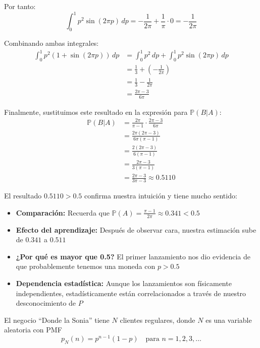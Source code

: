 \documentclass[
  11pt,
  letterpaper,
   addpoints,
  answers
  ]{exam}
\begin{document}
\begin{questions}
\begin{solution}
Por tanto:
\begin{equation}
\int_0^1 p^2 \sin(2\pi p) \, dp = -\frac{1}{2\pi} + \frac{1}{\pi} \cdot 0 = -\frac{1}{2\pi}
\end{equation}

Combinando ambas integrales:
\begin{align}
\int_0^1 p^2(1 + \sin(2\pi p)) \, dp &= \int_0^1 p^2 \, dp + \int_0^1 p^2 \sin(2\pi p) \, dp \\
&= \frac{1}{3} + \left(-\frac{1}{2\pi}\right) \\
&= \frac{1}{3} - \frac{1}{2\pi} \\
&= \frac{2\pi - 3}{6\pi}
\end{align}

Finalmente, sustituimos este resultado en la expresión para $\mathbb{P}(B | A)$:
\begin{align}
\mathbb{P}(B | A) &= \frac{2\pi}{\pi - 1} \cdot \frac{2\pi - 3}{6\pi} \\
&= \frac{2\pi(2\pi - 3)}{6\pi(\pi - 1)} \\
&= \frac{2(2\pi - 3)}{6(\pi - 1)} \\
&= \frac{2\pi - 3}{3(\pi - 1)} \\
&= \frac{2\pi - 3}{3\pi - 3} \approx 0.5110
\end{align}


El resultado $0.5110 > 0.5$ confirma nuestra intuición y tiene mucho sentido:
\begin{itemize}
\item \textbf{Comparación:} Recuerda que $\mathbb{P}(A) = \frac{\pi-1}{2\pi} \approx 0.341 < 0.5$
\item \textbf{Efecto del aprendizaje:} Después de observar cara, nuestra estimación sube de $0.341$ a $0.511$
\item \textbf{¿Por qué es mayor que 0.5?} El primer lanzamiento nos dio evidencia de que probablemente tenemos una moneda con $p > 0.5$
\item \textbf{Dependencia estadística:} Aunque los lanzamientos son físicamente independientes, estadísticamente están correlacionados a través de nuestro desconocimiento de $P$
\end{itemize}
\end{solution}
\question El negocio ``Donde la Sonia'' tiene $N$ clientes regulares, donde $N$ es una variable aleatoria con PMF
\begin{equation}
p_N(n) = p^{n-1}(1-p) \quad \text{para } n = 1, 2, 3, \ldots
\end{equation}


\end{questions}
\end{document}
